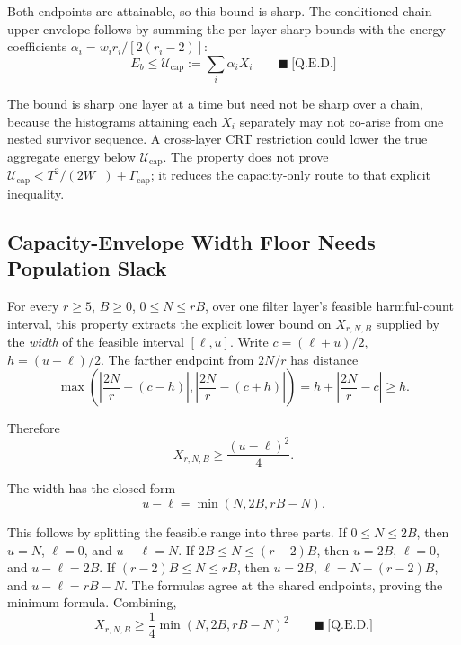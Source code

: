 Both endpoints are attainable, so this bound is sharp. The conditioned-chain
upper envelope follows by summing the per-layer sharp bounds with the energy
coefficients $\alpha_i=w_ir_i/[2(r_i-2)]$:
\begin{equation*}
E_b\le\mathcal U_{\mathrm{cap}}:=\sum_i\alpha_iX_i
\qquad\blacksquare\ \text{[Q.E.D.]}
\end{equation*}

The bound is sharp one layer at a time but need not be sharp
over a chain, because the histograms attaining each $X_i$ separately may not
co-arise from one nested survivor sequence. A cross-layer CRT restriction
could lower the true aggregate energy below $\mathcal U_{\mathrm{cap}}$. The
property does not prove $\mathcal U_{\mathrm{cap}}\lt T^2/(2W_-)+\Gamma_{\mathrm{cap}}$;
it reduces the capacity-only route to that explicit inequality.

\subsection{Capacity-Envelope Width Floor Needs Population Slack}
\label{sec:appendix-c-2}

For every $r\ge5$, $B\ge0$, $0\le N\le rB$, over one filter layer's feasible
harmful-count interval, this property extracts the explicit lower bound on
$X_{r,N,B}$ supplied by
the \emph{width} of the feasible interval $[\ell,u]$. Write
$c=(\ell+u)/2$, $h=(u-\ell)/2$. The farther endpoint from $2N/r$ has distance
\begin{equation*}
\max\left(\left|\frac{2N}{r}-(c-h)\right|,\left|\frac{2N}{r}-(c+h)\right|\right)
=h+\left|\frac{2N}{r}-c\right|\ge h.
\end{equation*}

Therefore
\begin{equation*}
X_{r,N,B}\ge\frac{(u-\ell)^2}{4}.
\end{equation*}

The width has the closed form
\begin{equation*}
u-\ell=\min(N,2B,rB-N).
\end{equation*}

This follows by splitting the feasible range into three parts. If
$0\le N\le 2B$, then $u=N$, $\ell=0$, and $u-\ell=N$. If
$2B\le N\le(r-2)B$, then $u=2B$, $\ell=0$, and $u-\ell=2B$. If
$(r-2)B\le N\le rB$, then $u=2B$, $\ell=N-(r-2)B$, and $u-\ell=rB-N$. The
formulas agree at the shared endpoints, proving the minimum formula.
Combining,
\begin{equation*}
X_{r,N,B}\ge\frac14\min(N,2B,rB-N)^2
\qquad\blacksquare\ \text{[Q.E.D.]}
\end{equation*}

